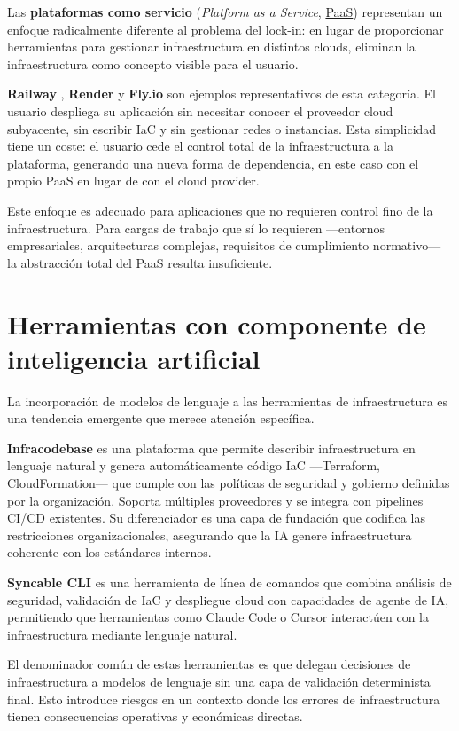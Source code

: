 Las \textbf{plataformas como servicio} (\textit{Platform as a Service}, \hyperlink{paas}{PaaS})
representan un enfoque radicalmente diferente al problema del lock-in: en lugar
de proporcionar herramientas para gestionar infraestructura en distintos clouds,
eliminan la infraestructura como concepto visible para el usuario.

\textbf{Railway} \cite{railwayDocs}, \textbf{Render} \cite{renderDocs} y
\textbf{Fly.io} \cite{flyioDocs} son ejemplos representativos de esta categoría.
El usuario despliega su aplicación sin necesitar conocer el proveedor cloud
subyacente, sin escribir IaC y sin gestionar redes o instancias. Esta simplicidad
tiene un coste: el usuario cede el control total de la infraestructura a la
plataforma, generando una nueva forma de dependencia, en este caso con el
propio PaaS en lugar de con el cloud provider.

Este enfoque es adecuado para aplicaciones que no requieren control fino de la
infraestructura. Para cargas de trabajo que sí lo requieren —entornos empresariales,
arquitecturas complejas, requisitos de cumplimiento normativo— la abstracción
total del PaaS resulta insuficiente.

\section{Herramientas con componente de inteligencia artificial}

La incorporación de modelos de lenguaje a las herramientas de infraestructura
es una tendencia emergente que merece atención específica.

\textbf{Infracodebase} \cite{infracodebaseDocs} es una plataforma que permite
describir infraestructura en lenguaje natural y genera automáticamente código
IaC —Terraform, CloudFormation— que cumple con las políticas de seguridad y
gobierno definidas por la organización. Soporta múltiples proveedores y se integra
con pipelines CI/CD existentes. Su diferenciador es una capa de fundación que
codifica las restricciones organizacionales, asegurando que la IA genere
infraestructura coherente con los estándares internos.

\textbf{Syncable CLI} \cite{syncableCli} es una herramienta de línea de comandos
que combina análisis de seguridad, validación de IaC y despliegue cloud con
capacidades de agente de IA, permitiendo que herramientas como Claude Code o
Cursor interactúen con la infraestructura mediante lenguaje natural.

El denominador común de estas herramientas es que delegan decisiones de
infraestructura a modelos de lenguaje sin una capa de validación determinista
final. Esto introduce riesgos en un contexto donde los errores de infraestructura
tienen consecuencias operativas y económicas directas.

